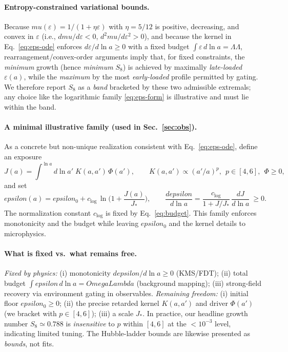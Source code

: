 \documentclass[aps,prd,onecolumn,superscriptaddress,nofootinbib]{revtex4-2}
\def\OmL{OmegaLambda}%
\def\eps{epsilon}%
\def\mu{mu}%
\def\Omega_\Lambda{OmegaLambda}%
\providecommand{\OmL}{\Omega_\Lambda}
\providecommand{\eps}{\varepsilon}
\begin{document}
\paragraph{Entropy-constrained variational bounds.}
Because \(\mu(\varepsilon)=1/(1+\eta\varepsilon)\) with \(\eta=5/12\) is positive, decreasing, and convex in \(\varepsilon\) (i.e., \(d\mu/d\varepsilon<0\), \(d^2\mu/d\varepsilon^2>0\)), and because the kernel in Eq.~\eqref{eq:eps-ode} enforces \(d\varepsilon/d\ln a\ge 0\) with a fixed budget \(\int\varepsilon\,d\ln a=\Omega_\Lambda\), rearrangement/convex-order arguments imply that, for fixed constraints, the \emph{minimum} growth (hence \emph{minimum} \(S_8\)) is achieved by maximally \emph{late-loaded} \(\varepsilon(a)\), while the \emph{maximum} by the most \emph{early-loaded} profile permitted by gating. We therefore report \(S_8\) as a \emph{band} bracketed by these two admissible extremals; any choice like the logarithmic family \eqref{eq:eps-form} is illustrative and must lie within the band.

\paragraph{A minimal illustrative family (used in Sec.~\ref{sec:obs}).}
As a concrete but non-unique realization consistent with Eq.~\eqref{eq:eps-ode}, define an exposure
\begin{equation}
\label{eq:Jdef}
J(a)=\int^{\ln a}\! d\ln a'\; K(a,a')\, \Phi(a'),\qquad K(a,a')\propto (a'/a)^p,\ \ p\in[4,6],\ \ \Phi\ge 0,
\end{equation}
and set
\begin{equation}
\label{eq:eps-form}
\eps(a)=\eps_0+c_{\log}\,\ln\!\Big(1+\frac{J(a)}{J_*}\Big),\qquad \frac{d\eps}{d\ln a}=\frac{c_{\log}}{1+J/J_*}\,\frac{dJ}{d\ln a}\ \ge 0.
\end{equation}
The normalization constant \(c_{\log}\) is fixed by Eq.~\eqref{eq:budget}. This family enforces monotonicity and the budget while leaving \(\eps_0\) and the kernel details to microphysics.

\paragraph{What is fixed vs.\ what remains free.}
\emph{Fixed by physics:} (i) monotonicity \(d\eps/d\ln a\ge 0\) (KMS/FDT); (ii) total budget \(\int \eps\, d\ln a=\OmL\) (background mapping); (iii) strong-field recovery via environment gating in observables. \emph{Remaining freedom:} (i) initial floor \(\eps_0\ge 0\); (ii) the precise retarded kernel \(K(a,a')\) and driver \(\Phi(a')\) (we bracket with \(p\in[4,6]\)); (iii) a scale \(J_*\). In practice, our headline growth number \(S_8\simeq 0.788\) is \emph{insensitive} to \(p\) within \([4,6]\) at the \(<10^{-3}\) level, indicating limited tuning. The Hubble-ladder bounds are likewise presented as \emph{bounds}, not fits.
\end{document}
